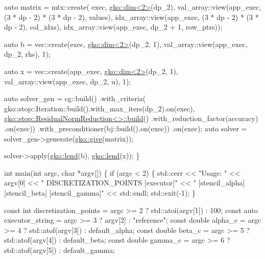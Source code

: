 {\begin{DoxyCodeInclude}
    \textcolor{keyword}{auto} matrix = mtx::create(
        exec, \hyperlink{structgko_1_1dim}{gko::dim<2>}(dp\_2),
        val\_array::view(app\_exec, (3 * dp - 2) * (3 * dp - 2), values),
        idx\_array::view(app\_exec, (3 * dp - 2) * (3 * dp - 2), col\_idxs),
        idx\_array::view(app\_exec, dp\_2 + 1, row\_ptrs));

    \textcolor{keyword}{auto} b = vec::create(exec, \hyperlink{structgko_1_1dim}{gko::dim<2>}(dp\_2, 1),
                         val\_array::view(app\_exec, dp\_2, rhs), 1);

    \textcolor{keyword}{auto} x = vec::create(app\_exec, \hyperlink{structgko_1_1dim}{gko::dim<2>}(dp\_2, 1),
                         val\_array::view(app\_exec, dp\_2, u), 1);

    \textcolor{keyword}{auto} solver\_gen =
        cg::build()
            .with\_criteria(
                gko::stop::Iteration::build().with\_max\_iters(dp\_2).on(exec),
                \hyperlink{classgko_1_1stop_1_1ResidualNormReduction}{gko::stop::ResidualNormReduction<>::build}()
                    .with\_reduction\_factor(accuracy)
                    .on(exec))
            .with\_preconditioner(bj::build().on(exec))
            .on(exec);
    \textcolor{keyword}{auto} solver = solver\_gen->generate(\hyperlink{namespacegko_acbd3fd6d07e498892881e8e2ab0b4167}{gko::give}(matrix));

    solver->apply(\hyperlink{namespacegko_aa8cb4876b72e5e1036ea9575443c439b}{gko::lend}(b), \hyperlink{namespacegko_aa8cb4876b72e5e1036ea9575443c439b}{gko::lend}(x));
\}


\textcolor{keywordtype}{int} main(\textcolor{keywordtype}{int} argc, \textcolor{keywordtype}{char} *argv[])
\{
    \textcolor{keywordflow}{if} (argc < 2) \{
        std::cerr << \textcolor{stringliteral}{"Usage: "} << argv[0] << \textcolor{stringliteral}{" DISCRETIZATION\_POINTS [executor]"}
                  << \textcolor{stringliteral}{" [stencil\_alpha] [stencil\_beta] [stencil\_gamma]"}
                  << std::endl;
        std::exit(-1);
    \}

    \textcolor{keyword}{const} \textcolor{keywordtype}{int} discretization\_points = argc >= 2 ? std::atoi(argv[1]) : 100;
    \textcolor{keyword}{const} \textcolor{keyword}{auto} executor\_string = argc >= 3 ? argv[2] : \textcolor{stringliteral}{"reference"};
    \textcolor{keyword}{const} \textcolor{keywordtype}{double} alpha\_c = argc >= 4 ? std::atof(argv[3]) : default\_alpha;
    \textcolor{keyword}{const} \textcolor{keywordtype}{double} beta\_c = argc >= 5 ? std::atof(argv[4]) : default\_beta;
    \textcolor{keyword}{const} \textcolor{keywordtype}{double} gamma\_c = argc >= 6 ? std::atof(argv[5]) : default\_gamma;


\end{DoxyCodeInclude}}
